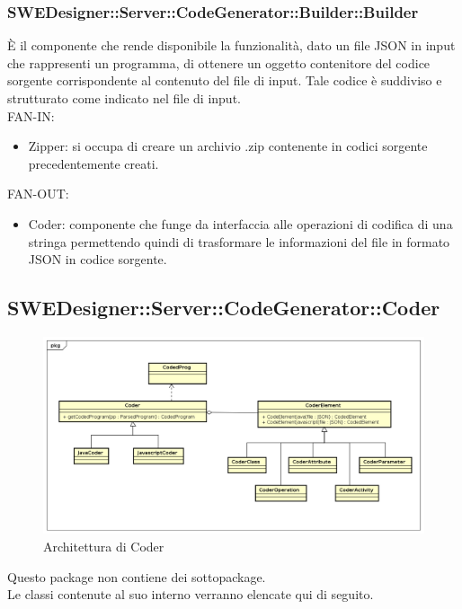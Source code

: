 \documentclass[../DefinizioneDiProdotto.tex]{subfiles}
\begin{document}
				\subsubsection{SWEDesigner::Server::CodeGenerator::Builder::Builder}
				È il componente che rende disponibile la funzionalità, dato un file JSON in input che rappresenti un programma, di ottenere un oggetto contenitore del codice sorgente corrispondente al contenuto del file di input. Tale codice è suddiviso e strutturato come indicato nel file di input.\\
					FAN-IN:
					\begin{itemize}
						\item Zipper: si occupa di creare un archivio .zip contenente in codici sorgente precedentemente creati.
					\end{itemize}
					FAN-OUT:
					\begin{itemize}
						\item Coder: componente che funge da interfaccia alle operazioni di codifica di una stringa permettendo quindi di trasformare le informazioni del file in formato JSON in codice sorgente.
					\end{itemize}

			\subsection{SWEDesigner::Server::CodeGenerator::Coder}
				\begin{figure}[H]\label{fig:Coder}
					\centering
					\includegraphics[scale=0.46]{Immagini/DiagrammaArchitettura/Coder.png}
					\caption{Architettura di Coder}
				\end{figure}

				Questo package non contiene dei sottopackage.\\
				Le classi contenute al suo interno verranno elencate qui di seguito.
\end{document}
